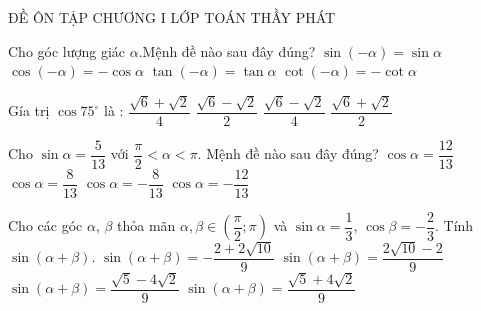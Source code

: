 \setcounter{deso}{1}
\begin{name}
	{\tenchude}
	{ĐỀ ÔN TẬP CHƯƠNG I}
	{LỚP TOÁN THẦY PHÁT}
	{\thoigian}
\end{name}
\TN
\begin{ex}
	Cho góc lượng giác $\alpha $.Mệnh đề nào sau đây đúng?
	\choice
	{$\sin \left(-\alpha\right)=\sin \alpha $}
	{$\cos \left(-\alpha\right)=-\cos \alpha $}
	{$\tan \left(-\alpha\right)=\tan \alpha $}
	{\True $\cot \left(-\alpha\right)=-\cot \alpha $}
\end{ex}
\begin{ex}
	Gía trị $\cos 75^\circ $ là :
	\choice
	{$\dfrac{\sqrt{6}+\sqrt{2}}{4}$}
	{$\dfrac{\sqrt{6}-\sqrt{2}}{2}$}
	{\True $\dfrac{\sqrt{6}-\sqrt{2}}{4}$}
	{$\dfrac{\sqrt{6}+\sqrt{2}}{2}$}
\end{ex}
\begin{ex}
	Cho $\sin \alpha =\dfrac{5}{13}$ với $\dfrac{\pi }{2}<\alpha <\pi $. Mệnh đề nào sau đây đúng?
	\choice
	{$\cos \alpha =\dfrac{12}{13}$}
	{$\cos \alpha =\dfrac{8}{13}$}
	{$\cos \alpha =-\dfrac{8}{13}$}
	{\True $\cos \alpha =-\dfrac{12}{13}$}
\end{ex}
\begin{ex}
	Cho các góc $\alpha $, $\beta $ thỏa mãn $\alpha ,\beta \in \left(\dfrac{\pi }{2};\pi\right)$ và $\sin \alpha =\dfrac{1}{3}$, $\cos \beta =-\dfrac{2}{3}$. Tính $\sin \left(\alpha +\beta\right)$.
	\choice
	{\True $\sin \left(\alpha +\beta\right)=-\dfrac{2+2\sqrt{10}}{9}$}
	{$\sin \left(\alpha +\beta\right)=\dfrac{2\sqrt{10}-2}{9}$}
	{$\sin \left(\alpha +\beta\right)=\dfrac{\sqrt{5}-4\sqrt{2}}{9}$}
	{$\sin \left(\alpha +\beta\right)=\dfrac{\sqrt{5}+4\sqrt{2}}{9}$}
\end{ex}

